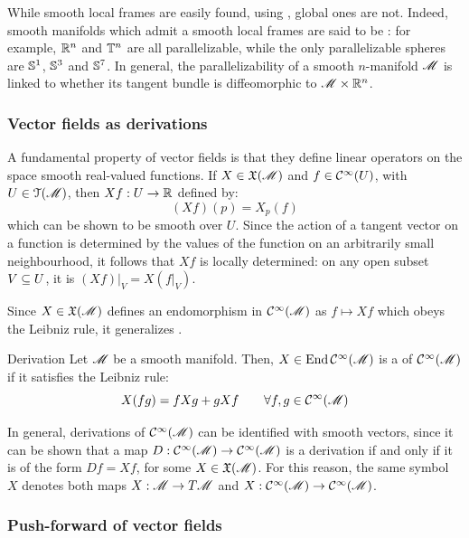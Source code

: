 While smooth local frames are easily found, using , global ones are not. Indeed, smooth manifolds which admit a smooth local frames are said to be : for example, $ \mathbb{R}^n $ and $ \mathbb{T}^{n} $ are all parallelizable, while the only parallelizable spheres are $ \mathbb{S}^{1} $, $ \mathbb{S}^{3} $ and $ \mathbb{S}^{7} $. In general, the parallelizability of a smooth $ n $-manifold $ \mathscr{M} $ is linked to whether its tangent bundle is diffeomorphic to $ \mathscr{M} \times \mathbb{R}^n $.

\subsubsection{Vector fields as derivations}

A fundamental property of vector fields is that they define linear operators on the space smooth real-valued functions. If $ X \in \mathfrak{X}(\mathscr{M}) $ and $ f \in \mathcal{C}^{\infty}(U) $, with $ U \in \EuScript{T}(\mathscr{M}) $, then $ Xf : U \rightarrow \mathbb{R} $ defined by:
\begin{equation}
  (Xf)(p) = X_p(f)
\end{equation}
which can be shown to be smooth over $ U $. Since the action of a tangent vector on a function is determined by the values of the function on an arbitrarily small neighbourhood, it follows that $ Xf $ is locally determined: on any open subset $ V \subseteq U $, it is $ (Xf)\vert_V = X(f\vert_V) $.

Since $ X \in \mathfrak{X}(\mathscr{M}) $ defines an endomorphism in $ \mathcal{C}^{\infty}(\mathscr{M}) $ as $ f \mapsto Xf $ which obeys the Leibniz rule, it generalizes .

\begin{definition}{Derivation}{}
  Let $ \mathscr{M} $ be a smooth manifold. Then, $ X \in \operatorname{End} \mathcal{C}^{\infty}(\mathscr{M}) $ is a  of $ \mathcal{C}^{\infty}(\mathscr{M}) $ if it satisfies the Leibniz rule:
  \begin{equation}
    X (fg) = f Xg + g Xf
    \qquad
    \forall f,g \in \mathcal{C}^{\infty}(\mathscr{M})
  \end{equation}
\end{definition}

In general, derivations of $ \mathcal{C}^{\infty}(\mathscr{M}) $ can be identified with smooth vectors, since it can be shown that a map $ D : \mathcal{C}^{\infty}(\mathscr{M}) \rightarrow \mathcal{C}^{\infty}(\mathscr{M}) $ is a derivation if and only if it is of the form $ D f = X f $, for some $ X \in \mathfrak{X}(\mathscr{M}) $. For this reason, the same symbol $ X $ denotes both maps $ X : \mathscr{M} \rightarrow T\mathscr{M} $ and $ X : \mathcal{C}^{\infty}(\mathscr{M}) \rightarrow \mathcal{C}^{\infty}(\mathscr{M}) $.

\subsubsection{Push-forward of vector fields}

